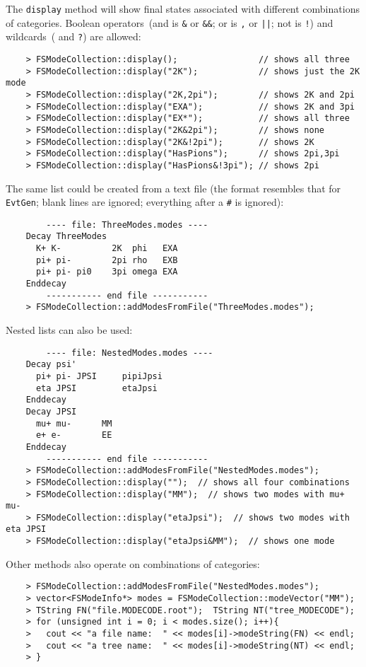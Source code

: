 \documentclass[11pt]{article}
\begin{document}
The {\tt display} method will show final states associated with different combinations of categories.  Boolean operators~(and is {\tt\&} or {\tt\&\&}; or is {\tt,} or {\tt||}; not is {\tt!}) and wildcards~({\tt*} and {\tt?}) are allowed:
\begin{verbatim}
    > FSModeCollection::display();                // shows all three
    > FSModeCollection::display("2K");            // shows just the 2K mode
    > FSModeCollection::display("2K,2pi");        // shows 2K and 2pi
    > FSModeCollection::display("EXA");           // shows 2K and 3pi
    > FSModeCollection::display("EX*");           // shows all three
    > FSModeCollection::display("2K&2pi");        // shows none
    > FSModeCollection::display("2K&!2pi");       // shows 2K
    > FSModeCollection::display("HasPions");      // shows 2pi,3pi
    > FSModeCollection::display("HasPions&!3pi"); // shows 2pi
\end{verbatim}

The same list could be created from a text file (the format resembles that for {\tt EvtGen}; blank lines are ignored; everything after a {\tt \#} is ignored):
\begin{verbatim}
        ---- file: ThreeModes.modes ----
    Decay ThreeModes
      K+ K-          2K  phi   EXA
      pi+ pi-        2pi rho   EXB
      pi+ pi- pi0    3pi omega EXA
    Enddecay
        ----------- end file -----------
    > FSModeCollection::addModesFromFile("ThreeModes.modes");
\end{verbatim}
Nested lists can also be used:
\begin{verbatim}
        ---- file: NestedModes.modes ----
    Decay psi'
      pi+ pi- JPSI     pipiJpsi
      eta JPSI         etaJpsi
    Enddecay
    Decay JPSI
      mu+ mu-      MM
      e+ e-        EE
    Enddecay
        ----------- end file -----------
    > FSModeCollection::addModesFromFile("NestedModes.modes");
    > FSModeCollection::display("");  // shows all four combinations 
    > FSModeCollection::display("MM");  // shows two modes with mu+ mu- 
    > FSModeCollection::display("etaJpsi");  // shows two modes with eta JPSI 
    > FSModeCollection::display("etaJpsi&MM");  // shows one mode 
\end{verbatim}

Other methods also operate on combinations of categories:
\begin{verbatim}
    > FSModeCollection::addModesFromFile("NestedModes.modes");
    > vector<FSModeInfo*> modes = FSModeCollection::modeVector("MM");
    > TString FN("file.MODECODE.root");  TString NT("tree_MODECODE");
    > for (unsigned int i = 0; i < modes.size(); i++){ 
    >   cout << "a file name:  " << modes[i]->modeString(FN) << endl;
    >   cout << "a tree name:  " << modes[i]->modeString(NT) << endl;
    > }
\end{verbatim}
\end{document}
